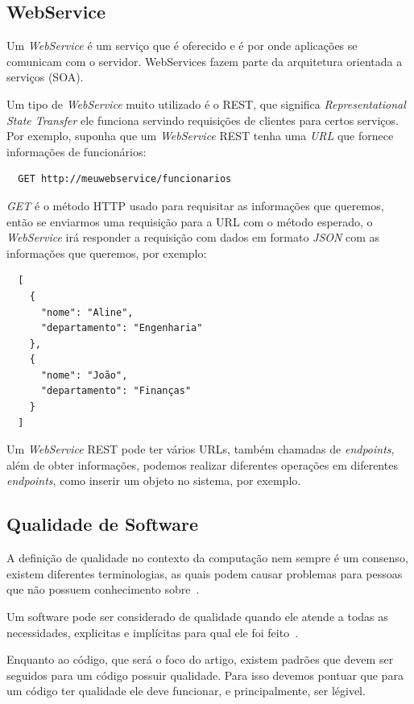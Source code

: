 \documentclass[12pt]{article}
\begin{document}
\subsection{WebService}\label{WebService}

Um \textit{WebService} é um serviço que é oferecido e é por onde aplicações se comunicam com o servidor.
WebServices fazem parte da arquitetura orientada a serviços (SOA).

Um tipo de \textit{WebService} muito utilizado é o REST, que significa
\emph{Representational State Transfer} ele funciona servindo requisições de clientes
para certos serviços. Por exemplo, suponha que um \textit{WebService} REST tenha uma \textit{URL} que fornece
informações de funcionários:

\begin{verbatim}
  GET http://meuwebservice/funcionarios
\end{verbatim}

\textit{GET} é o método HTTP usado para requisitar as informações que queremos, então se enviarmos uma requisição
para a URL com o método esperado, o \textit{WebService} irá responder a requisição com dados em formato \textit{JSON} com as informações que queremos, por exemplo:

\begin{verbatim}
  [
    {
      "nome": "Aline",
      "departamento": "Engenharia"
    },
    {
      "nome": "João",
      "departamento": "Finanças"
    }
  ]
\end{verbatim}

Um \textit{WebService} REST pode ter vários URLs, também chamadas de \textit{endpoints}, além de obter informações, podemos realizar
diferentes operações em diferentes \textit{endpoints}, como inserir um objeto no sistema, por exemplo.

\subsection{Qualidade de Software}

A definição de qualidade no contexto da computação nem sempre é um consenso,
existem diferentes terminologias, as quais podem causar problemas para pessoas que não
possuem conhecimento sobre~\cite{Duarte03}.

Um software pode ser considerado de qualidade quando ele atende a todas as necessidades, explicitas
e implícitas para qual ele foi feito~\cite{Duarte03}.

Enquanto ao código, que será o foco do artigo, existem padrões que devem ser seguidos para um código
possuir qualidade. Para isso devemos pontuar que para um código ter qualidade ele deve funcionar, e principalmente,
ser légivel.
\end{document}
